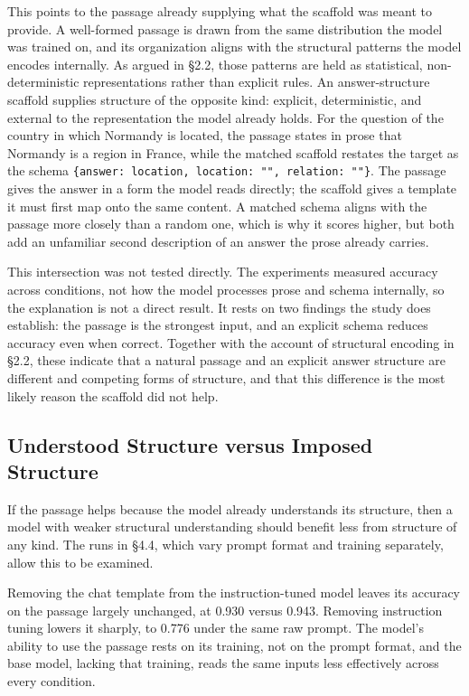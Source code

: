 \documentclass{article}
\begin{document}
This points to the passage already supplying what the scaffold was meant to provide. A well-formed passage is drawn from the same distribution the model was trained on, and its organization aligns with the structural patterns the model encodes internally. As argued in \S2.2, those patterns are held as statistical, non-deterministic representations rather than explicit rules. An answer-structure scaffold supplies structure of the opposite kind: explicit, deterministic, and external to the representation the model already holds. For the question of the country in which Normandy is located, the passage states in prose that Normandy is a region in France, while the matched scaffold restates the target as the schema \texttt{\{answer: location, location: "", relation: ""\}}. The passage gives the answer in a form the model reads directly; the scaffold gives a template it must first map onto the same content. A matched schema aligns with the passage more closely than a random one, which is why it scores higher, but both add an unfamiliar second description of an answer the prose already carries.

This intersection was not tested directly. The experiments measured accuracy across conditions, not how the model processes prose and schema internally, so the explanation is not a direct result. It rests on two findings the study does establish: the passage is the strongest input, and an explicit schema reduces accuracy even when correct. Together with the account of structural encoding in \S2.2, these indicate that a natural passage and an explicit answer structure are different and competing forms of structure, and that this difference is the most likely reason the scaffold did not help.

\subsection{Understood Structure versus Imposed Structure}

If the passage helps because the model already understands its structure, then a model with weaker structural understanding should benefit less from structure of any kind. The runs in \S4.4, which vary prompt format and training separately, allow this to be examined.

Removing the chat template from the instruction-tuned model leaves its accuracy on the passage largely unchanged, at 0.930 versus 0.943. Removing instruction tuning lowers it sharply, to 0.776 under the same raw prompt. The model's ability to use the passage rests on its training, not on the prompt format, and the base model, lacking that training, reads the same inputs less effectively across every condition.
\end{document}
